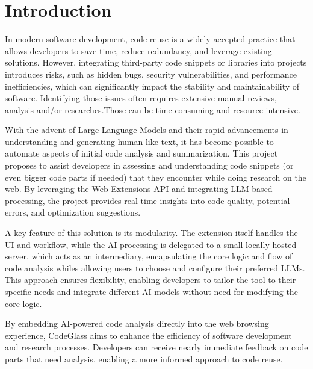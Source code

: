 \section{Introduction}

In modern software development, code reuse is a widely accepted practice that
allows developers to save time, reduce redundancy, and leverage existing solutions.
However, integrating third-party code snippets or libraries into projects introduces 
risks, such as hidden bugs, security vulnerabilities, and
performance inefficiencies, which can significantly impact the stability and
maintainability of software. Identifying those issues often requires extensive
manual reviews, analysis and/or researches.Those can be time-consuming and
resource-intensive.

With the advent of Large Language Models \autocite{LLMs} and their rapid advancements in
understanding and generating human-like text, it has become possible to automate
aspects of initial code analysis and summarization. This project proposes to
assist developers in assessing and understanding code snippets (or even bigger
code parts if needed) that they encounter while doing research on the web. By
leveraging the Web Extensions API \autocite{CFD} and integrating LLM-based
processing, the project provides real-time insights into code quality,
potential errors, and optimization suggestions.

A key feature of this solution is its modularity. The extension itself handles
the UI and workflow, while the AI processing is delegated to a small locally hosted
server, which acts as an intermediary, encapsulating the core
logic and flow of code analysis whiles allowing users to choose and configure their
preferred LLMs. This approach ensures flexibility, enabling developers
to tailor the tool to their specific needs and integrate different
AI models without need for modifying the core logic.

By embedding AI-powered code analysis directly into the web browsing experience,
CodeGlass aims to enhance the efficiency of software development and research
processes. Developers can receive nearly immediate feedback on code parts that
need analysis, enabling a more informed approach to code reuse.
